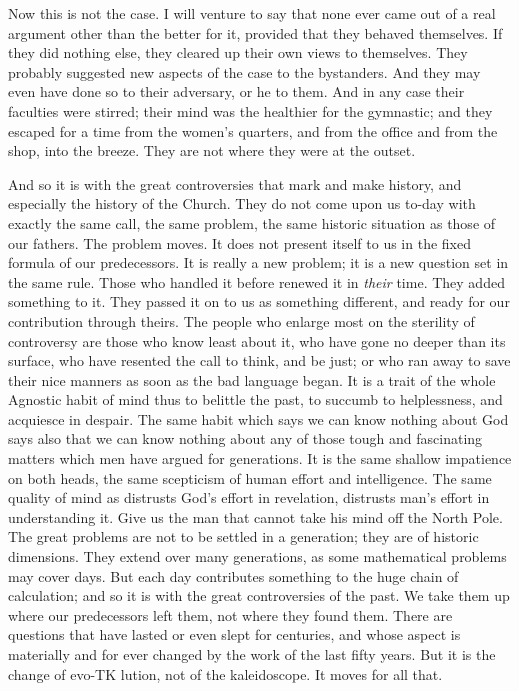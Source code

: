 \documentclass[12pt,a5paper,oneside]{book}
\begin{document}
Now this is not the case. I will venture to say 
that none ever came out of a real argument other 
than the better for it, provided that they behaved 
themselves. If they did nothing else, they cleared up 
their own views to themselves. They probably suggested 
new aspects of the case to the bystanders. And 
they may even have done so to their adversary, or he 
to them. And in any case their faculties were 
stirred; their mind was the healthier for the gymnastic; 
and they escaped for a time from the women's 
quarters, and from the office and from the shop, into 
the breeze. They are not where they were at the 
outset. 

And so it is with the great controversies that mark 
and make history, and especially the history of the 
Church. They do not come upon us to-day with 
exactly the same call, the same problem, the same 
historic situation as those of our fathers. The problem 
moves. It does not present itself to us in the 
fixed formula of our predecessors. It is really a new 
problem; it is a new question set in the same rule. 
Those who handled it before renewed it in \textit{their} time. 
They added something to it. They passed it on to 
us as something different, and ready for our contribution
through theirs. The people who enlarge most 
on the sterility of controversy are those who know 
least about it, who have gone no deeper than its 
surface, who have resented the call to think, and be 
just; or who ran away to save their nice manners 
as soon as the bad language began. It is a trait 
of the whole Agnostic habit of mind thus to belittle 
the past, to succumb to helplessness, and acquiesce 
in despair. The same habit which says we can know 
nothing about God says also that we can know nothing 
about any of those tough and fascinating matters 
which men have argued for generations. It is the 
same shallow impatience on both heads, the same 
scepticism of human effort and intelligence. The 
same quality of mind as distrusts God's effort in 
revelation, distrusts man's effort in understanding it. 
Give us the man that cannot take his mind off the 
North Pole. The great problems are not to be settled 
in a generation; they are of historic dimensions. 
They extend over many generations, as some mathematical 
problems may cover days. But each day contributes 
something to the huge chain of calculation; 
and so it is with the great controversies of the past. 
We take them up where our predecessors left them, 
not where they found them. There are questions 
that have lasted or even slept for centuries, and whose 
aspect is materially and for ever changed by the work 
of the last fifty years. But it is the change of evo-TK
lution, not of the kaleidoscope. It moves for all that. 
\end{document}
